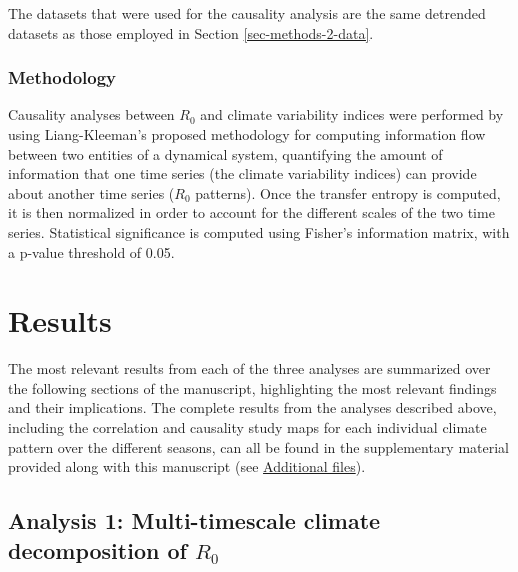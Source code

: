 \documentclass[10pt,twocolumn]{wlscirep}
\begin{document}
The datasets that were used for the causality analysis are the same detrended datasets as those employed in Section \ref{sec-methods-2-data}.

\subsubsection{Methodology} \label{sec-methods-3-methodology}

Causality analyses between $R_0$ and climate variability indices were performed by using Liang-Kleeman's proposed methodology for computing information flow between two entities of a dynamical system, quantifying the amount of information that one time series (the climate variability indices) can provide about another time series ($R_0$ patterns)\cite{liang_2014}. Once the transfer entropy is computed, it is then normalized in order to account for the different scales of the two time series\cite{liang_2015}. Statistical significance is computed using Fisher's information matrix, with a p-value threshold of 0.05.

\section{Results}

The most relevant results from each of the three analyses are summarized over the following sections of the manuscript, highlighting the most relevant findings and their implications. The complete results from the analyses described above, including the correlation and causality study maps for each individual climate pattern over the different seasons, can all be found in the supplementary material provided along with this manuscript (see \hyperref[sec-additional-files]{Additional files}).


\subsection{Analysis 1: Multi-timescale climate decomposition of $R_0$} \label{sec-results-1}
\end{document}
